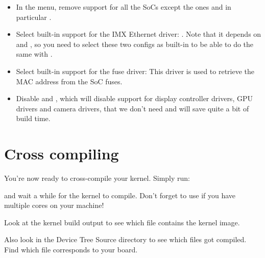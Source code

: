 \begin{itemize}
\if{}
\item In the  menu, remove support for all the
  SoCs except the  ones and in particular
  .
\item Select built-in support for the IMX Ethernet driver:
  . Note that it depends on 
  and , so you need to select these two configs as
  built-in to be able to do the same with .
\item Select built-in support for the fuse driver: 
  This driver is used to retrieve the MAC address from the SoC fuses.
\item Disable  and ,
  which will disable support for display controller drivers, GPU
  drivers and camera drivers, that we don't need and will save quite a
  bit of build time.
\fi

\end{itemize}



\section{Cross compiling}

You're now ready to cross-compile your kernel. Simply run:


and wait a while for the kernel to compile. Don't forget to use
 if you have multiple cores on your machine!

Look at the kernel build output to see which file contains
the kernel image.

Also look in the Device Tree Source directory to see which 
files got compiled. Find which  file corresponds to your board.

